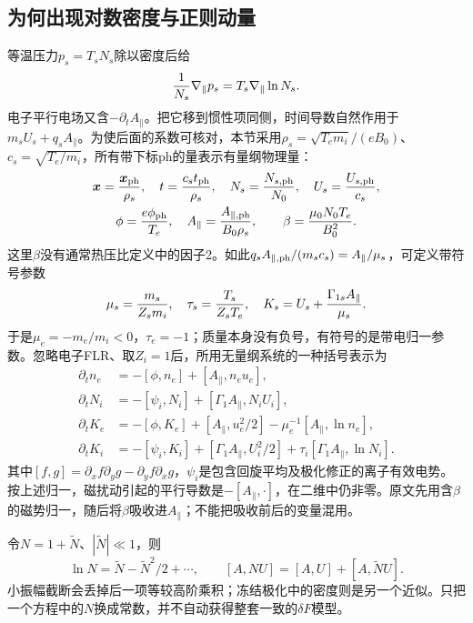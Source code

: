 \documentclass[UTF8,a4paper,11pt,openany,fontset=fandol]{ctexbook}
\begin{document}
\subsection{为何出现对数密度与正则动量}
等温压力$p_s=T_sN_s$除以密度后给
\begin{equation}
 {1\over N_s}\nabla_\parallel p_s=T_s\nabla_\parallel\ln N_s.
\end{equation}
电子平行电场又含$-\partial_tA_\parallel$。把它移到惯性项同侧，时间导数自然作用于$m_sU_s+q_sA_\parallel$。为使后面的系数可核对，本节采用$\rho_s=\sqrt{T_em_i}/(eB_0)$、$c_s=\sqrt{T_e/m_i}$，所有带下标$\mathrm{ph}$的量表示有量纲物理量：
\begin{gather}
 \bm{x}={\bm{x}_{\rm ph}\over\rho_s},\quad t={c_st_{\rm ph}\over\rho_s},\quad
 N_s={N_{s,\rm ph}\over N_0},\quad U_s={U_{s,\rm ph}\over c_s},\\
 \phi={e\phi_{\rm ph}\over T_e},\quad A_\parallel={A_{\parallel,\rm ph}\over B_0\rho_s},
 \qquad\beta={\mu_0N_0T_e\over B_0^2}.
\end{gather}
这里$\beta$没有通常热压比定义中的因子2。如此$q_sA_{\parallel,\rm ph}/(m_sc_s)=A_\parallel/\mu_s$，可定义带符号参数
\begin{equation}
 \mu_s={m_s\over Z_sm_i},\quad\tau_s={T_s\over Z_sT_e},\quad
 K_s=U_s+{\Gamma_{1s}A_\parallel\over\mu_s}.
\end{equation}
于是$\mu_e=-m_e/m_i<0$，$\tau_e=-1$；质量本身没有负号，有符号的是带电归一参数。忽略电子FLR、取$Z_i=1$后，所用无量纲系统的一种括号表示为
\begin{align}
 \partial_t n_e&=-[\phi,n_e]+[A_\parallel,n_eu_e],\\
 \partial_t N_i&=-[\psi_i,N_i]+[\Gamma_1A_\parallel,N_iU_i],\\
 \partial_t K_e&=-[\phi,K_e]+[A_\parallel,u_e^2/2]
                   -\mu_e^{-1}[A_\parallel,\ln n_e],\\
 \partial_t K_i&=-[\psi_i,K_i]+[\Gamma_1A_\parallel,U_i^2/2]
                   +\tau_i[\Gamma_1A_\parallel,\ln N_i].
\end{align}
其中$[f,g]=\partial_xf\partial_yg-\partial_yf\partial_xg$，$\psi_i$是包含回旋平均及极化修正的离子有效电势。按上述归一，磁扰动引起的平行导数是$-[A_\parallel,\cdot]$，在二维中仍非零。原文先用含$\beta$的磁势归一，随后将$\beta$吸收进$A_\parallel$；不能把吸收前后的变量混用。

令$N=1+\widetilde N$、$|\widetilde N|\ll1$，则
\begin{equation}
 \ln N=\widetilde N-\widetilde N^2/2+\cdots,\qquad
 [A,NU]=[A,U]+[A,\widetilde N U].
\end{equation}
小振幅截断会丢掉后一项等较高阶乘积；冻结极化中的密度则是另一个近似。只把一个方程中的$N$换成常数，并不自动获得整套一致的$\delta F$模型。
\end{document}
